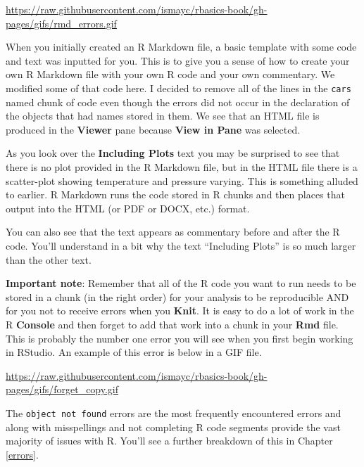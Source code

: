 \documentclass[]{tufte-book}
\theoremstyle{definition}
\theoremstyle{definition}
\theoremstyle{remark}
\begin{document}
\begin{center}\footnotesize{\url{https://raw.githubusercontent.com/ismayc/rbasics-book/gh-pages/gifs/rmd_errors.gif}}\end{center}

\vspace{0.1in}

When you initially created an R Markdown file, a basic template with
some code and text was inputted for you. This is to give you a sense of
how to create your own R Markdown file with your own R code and your own
commentary. We modified some of that code here. I decided to remove all
of the lines in the \texttt{cars} named chunk of code even though the
errors did not occur in the declaration of the objects that had names
stored in them. We see that an HTML file is produced in the
\textbf{Viewer} pane because \textbf{View in Pane} was selected.

As you look over the \textbf{Including Plots} text you may be surprised
to see that there is no plot provided in the R Markdown file, but in the
HTML file there is a scatter-plot showing temperature and pressure
varying. This is something alluded to earlier. R Markdown runs the code
stored in R chunks and then places that output into the HTML (or PDF or
DOCX, etc.) format.

You can also see that the text appears as commentary before and after
the R code. You'll understand in a bit why the text ``Including Plots''
is so much larger than the other text.

\textbf{Important note}: Remember that all of the R code you want to run
needs to be stored in a chunk (in the right order) for your analysis to
be reproducible AND for you not to receive errors when you
\textbf{Knit}. It is easy to do a lot of work in the R \textbf{Console}
and then forget to add that work into a chunk in your \textbf{Rmd} file.
This is probably the number one error you will see when you first begin
working in RStudio. An example of this error is below in a GIF file.

\vspace{0.1in}

\begin{center}\footnotesize{\url{https://raw.githubusercontent.com/ismayc/rbasics-book/gh-pages/gifs/forget_copy.gif}}\end{center}

\vspace{0.1in}

The \texttt{object\ not\ found} errors are the most frequently
encountered errors and along with misspellings and not completing R code
segments provide the vast majority of issues with R. You'll see a
further breakdown of this in Chapter \ref{errors}.
\end{document}

